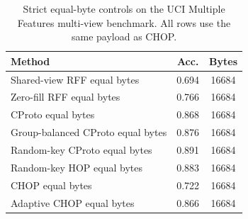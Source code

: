 \begin{table}[t]
\centering
\caption{Strict equal-byte controls on the UCI Multiple Features multi-view benchmark. All rows use the same payload as CHOP.}
\label{tab:strict-equal-byte-mfeat}
\begin{tabular}{lcc}
\toprule
Method & Acc. & Bytes \\
\midrule
Shared-view RFF equal bytes & 0.694 & 16684 \\
Zero-fill RFF equal bytes & 0.766 & 16684 \\
CProto equal bytes & 0.868 & 16684 \\
Group-balanced CProto equal bytes & 0.876 & 16684 \\
Random-key CProto equal bytes & 0.891 & 16684 \\
Random-key HOP equal bytes & 0.883 & 16684 \\
CHOP equal bytes & 0.722 & 16684 \\
Adaptive CHOP equal bytes & 0.866 & 16684 \\
\bottomrule
\end{tabular}
\end{table}

